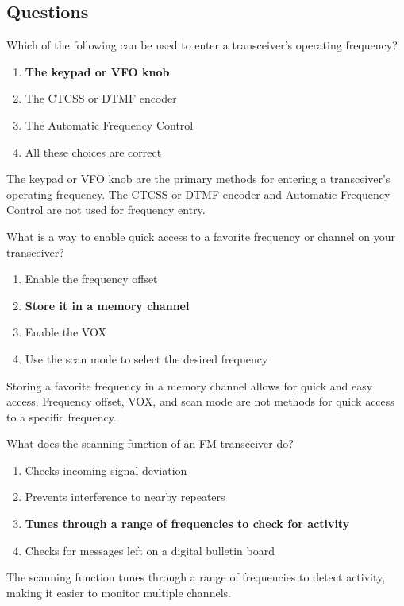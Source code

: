 \subsection*{Questions}
\begin{tcolorbox}[colback=gray!10!white,colframe=black!75!black,title={T4B02}]
    Which of the following can be used to enter a transceiver’s operating frequency?
    \begin{enumerate}[label=\Alph*,noitemsep]
        \item \textbf{The keypad or VFO knob}
        \item The CTCSS or DTMF encoder
        \item The Automatic Frequency Control
        \item All these choices are correct
    \end{enumerate}
\end{tcolorbox}
The keypad or VFO knob are the primary methods for entering a transceiver's operating frequency. The CTCSS or DTMF encoder and Automatic Frequency Control are not used for frequency entry.


\begin{tcolorbox}[colback=gray!10!white,colframe=black!75!black,title={T4B04}]
    What is a way to enable quick access to a favorite frequency or channel on your transceiver?
    \begin{enumerate}[label=\Alph*,noitemsep]
        \item Enable the frequency offset
        \item \textbf{Store it in a memory channel}
        \item Enable the VOX
        \item Use the scan mode to select the desired frequency
    \end{enumerate}
\end{tcolorbox}
Storing a favorite frequency in a memory channel allows for quick and easy access. Frequency offset, VOX, and scan mode are not methods for quick access to a specific frequency.


\begin{tcolorbox}[colback=gray!10!white,colframe=black!75!black,title={T4B05}]
    What does the scanning function of an FM transceiver do?
    \begin{enumerate}[label=\Alph*,noitemsep]
        \item Checks incoming signal deviation
        \item Prevents interference to nearby repeaters
        \item \textbf{Tunes through a range of frequencies to check for activity}
        \item Checks for messages left on a digital bulletin board
    \end{enumerate}
\end{tcolorbox}
The scanning function tunes through a range of frequencies to detect activity, making it easier to monitor multiple channels.

